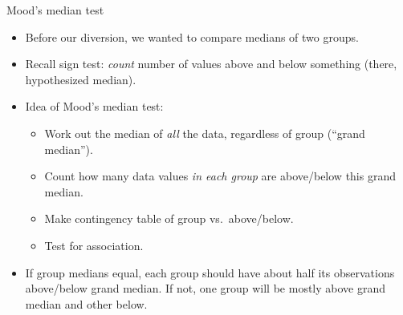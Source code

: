 \documentclass[unknownkeysallowed]{beamer}\usepackage[]{graphicx}\usepackage[]{color}
\begin{document}
\begin{frame}[fragile]{Mood's median test}
  
  \begin{itemize}
  \item Before our diversion, we wanted to compare medians of two
    groups.
  \item Recall sign test: \emph{count} number of values above and
    below something (there, hypothesized median).
  \item Idea of Mood's median test:
    \begin{itemize}
    \item Work out the median of \emph{all} the data, regardless of
      group (``grand median'').
    \item Count how many data values \emph{in each group} are
      above/below this grand median.
    \item Make contingency table of group vs.\ above/below.
    \item Test for association.
    \end{itemize}
  \item If group medians equal, each group should have about half its
    observations above/below grand median. If not, one group will be
    mostly above grand median and other below.
    
  \end{itemize}
  
\end{frame}
\end{document}
